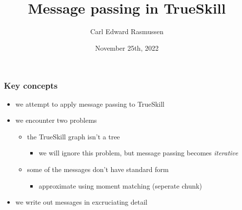 

\title{Message passing in TrueSkill}
\author{Carl Edward Rasmussen}
\date{November 25th, 2022}




\begin{frame}
\titlepage
\end{frame}


\begin{frame}
\frametitle{Key concepts}

\begin{itemize}
\item we attempt to apply message passing to TrueSkill
\item we encounter two problems
\begin{itemize}
\item the TrueSkill graph isn't a tree
\begin{itemize}
\item we will ignore this problem, but message passing becomes \emph{iterative}
\end{itemize}
\item some of the messages don't have standard form
\begin{itemize}
\item approximate using moment matching (seperate chunk)
\end{itemize}
\end{itemize}
\item we write out messages in excruciating detail
\end{itemize}

\end{frame}

